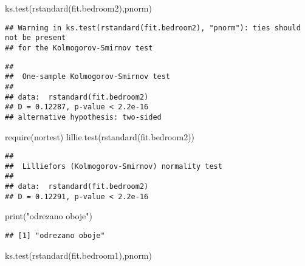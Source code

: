 \documentclass[
]{article}
\newenvironment{Shaded}{\begin{snugshade}}{\end{snugshade}}
\newcommand{\FunctionTok}[1]{\textcolor[rgb]{0.00,0.00,0.00}{#1}}
\newcommand{\NormalTok}[1]{#1}
\newcommand{\StringTok}[1]{\textcolor[rgb]{0.31,0.60,0.02}{#1}}
\begin{document}
\begin{Shaded}
\begin{Highlighting}[]
\FunctionTok{ks.test}\NormalTok{(}\FunctionTok{rstandard}\NormalTok{(fit.bedroom2),}\StringTok{\textquotesingle{}pnorm\textquotesingle{}}\NormalTok{)}
\end{Highlighting}
\end{Shaded}

\begin{verbatim}
## Warning in ks.test(rstandard(fit.bedroom2), "pnorm"): ties should not be present
## for the Kolmogorov-Smirnov test
\end{verbatim}

\begin{verbatim}
## 
##  One-sample Kolmogorov-Smirnov test
## 
## data:  rstandard(fit.bedroom2)
## D = 0.12287, p-value < 2.2e-16
## alternative hypothesis: two-sided
\end{verbatim}

\begin{Shaded}
\begin{Highlighting}[]
\FunctionTok{require}\NormalTok{(nortest)}
\FunctionTok{lillie.test}\NormalTok{(}\FunctionTok{rstandard}\NormalTok{(fit.bedroom2))}
\end{Highlighting}
\end{Shaded}

\begin{verbatim}
## 
##  Lilliefors (Kolmogorov-Smirnov) normality test
## 
## data:  rstandard(fit.bedroom2)
## D = 0.12291, p-value < 2.2e-16
\end{verbatim}

\begin{Shaded}
\begin{Highlighting}[]
\FunctionTok{print}\NormalTok{(}\StringTok{"odrezano oboje"}\NormalTok{)}
\end{Highlighting}
\end{Shaded}

\begin{verbatim}
## [1] "odrezano oboje"
\end{verbatim}

\begin{Shaded}
\begin{Highlighting}[]
\FunctionTok{ks.test}\NormalTok{(}\FunctionTok{rstandard}\NormalTok{(fit.bedroom1),}\StringTok{\textquotesingle{}pnorm\textquotesingle{}}\NormalTok{)}
\end{Highlighting}
\end{Shaded}
\end{document}
